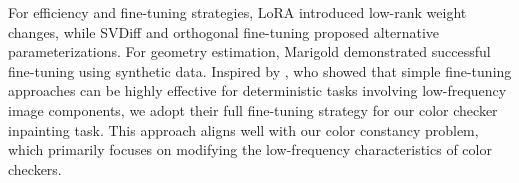 % 
For efficiency and fine-tuning strategies, LoRA \cite{hu2021lora} introduced low-rank weight changes, while SVDiff \cite{han2023svdiff} and orthogonal fine-tuning \cite{oft2023} proposed alternative parameterizations. For geometry estimation, Marigold \cite{ke2023marigold} demonstrated successful fine-tuning using synthetic data. Inspired by \citeauthor{garcia2024fine} \cite{garcia2024fine}, who showed that simple fine-tuning approaches can be highly effective for deterministic tasks involving low-frequency image components, we adopt their full fine-tuning strategy for our color checker inpainting task. This approach aligns well with our color constancy problem, which primarily focuses on modifying the low-frequency characteristics of color checkers.
